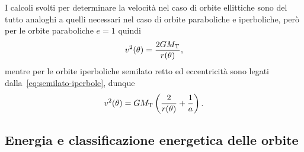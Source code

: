 I calcoli svolti per determinare la velocità nel caso di orbite ellittiche sono
del tutto analoghi a quelli necessari nel caso di orbite paraboliche e
iperboliche, però per le orbite paraboliche $e=1$ quindi
\begin{equation}
  \label{eq:velocita-parabola}
  v^2(\theta) = \frac{2GM_\textup{T}}{r(\theta)},
\end{equation}
mentre per le orbite iperboliche semilato retto ed eccentricità sono legati
dalla~\eqref{eq:semilato-iperbole}, dunque
\begin{equation}
  \label{eq:velocita-iperbole}
  v^2(\theta) = GM_\textup{T}
    \left(
      \frac{2}{r(\theta)} + \frac{1}{a}
    \right).
\end{equation}


\subsection{Energia e classificazione energetica delle orbite}
\label{sec:energia-orbite}

